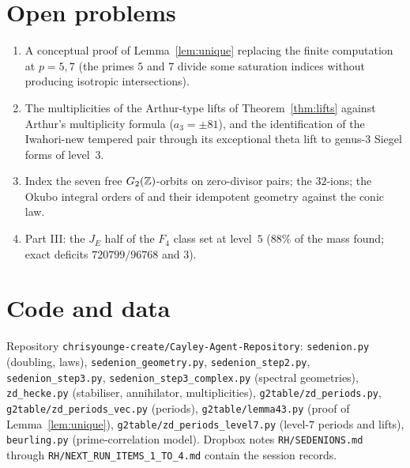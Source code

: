 \documentclass[11pt]{amsart}
\theoremstyle{definition}
\begin{document}
\section{Open problems}
\begin{enumerate}[leftmargin=2em]
\item A conceptual proof of Lemma~\ref{lem:unique} replacing the finite computation at $p=5,7$ (the primes $5$ and $7$ divide some saturation indices without producing isotropic intersections).
\item The multiplicities of the Arthur-type lifts of Theorem~\ref{thm:lifts} against Arthur's multiplicity formula ($a_3=\pm 81$), and the identification of the Iwahori-new tempered pair through its exceptional theta lift to genus-$3$ Siegel forms of level~$3$.
\item Index the seven free $G_2(\mathbb{Z})$-orbits on zero-divisor pairs; the $32$-ions; the Okubo integral orders of \cite{Corr26} and their idempotent geometry against the conic law.
\item Part III: the $J_E$ half of the $F_4$ class set at level~$5$ ($88\%$ of the mass found; exact deficits $720799/96768$ and $3$).
\end{enumerate}

\appendix
\section{Code and data}
Repository \texttt{chrisyounge-create/Cayley-Agent-Repository}: \texttt{sedenion.py} (doubling, laws), \texttt{sedenion\_geometry.py}, \texttt{sedenion\_step2.py}, \texttt{sedenion\_step3.py}, \texttt{sedenion\_step3\_complex.py} (spectral geometries), \texttt{zd\_hecke.py} (stabiliser, annihilator, multiplicities), \texttt{g2table/zd\_periods.py}, \texttt{g2table/zd\_periods\_vec.py} (periods), \texttt{g2table/lemma43.py} (proof of Lemma~\ref{lem:unique}), \texttt{g2table/zd\_periods\_level7.py} (level-$7$ periods and lifts), \texttt{beurling.py} (prime-correlation model). Dropbox notes \texttt{RH/SEDENIONS.md} through \texttt{RH/NEXT\_RUN\_ITEMS\_1\_TO\_4.md} contain the session records.
\end{document}
